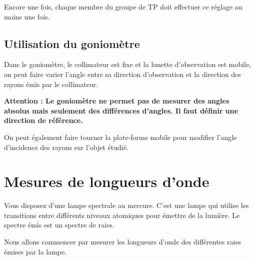 \documentclass{tp}
\begin{document}
Encore une fois, chaque membre du groupe de TP doit effectuer ce réglage au moins une fois.

\subsection{Utilisation du goniomètre}
Dans le goniomètre, le collimateur est fixe et la lunette d'observation est mobile, on peut faire varier l'angle entre sa direction d'observation et la direction des rayons émis par le collimateur.

\textbf{Attention : Le goniomètre ne permet pas de mesurer des angles absolus mais seulement des différences d'angles. Il faut définir une direction de référence.}

On peut également faire tourner la plate-forme mobile pour modifier l'angle d'incidence des rayons sur l'objet étudié.

\section{Mesures de longueurs d'onde}
Vous disposez d'une lampe spectrale au mercure. C'est une lampe qui utilise les transitions entre différents niveaux atomiques pour émettre de la lumière. Le spectre émis est un spectre de raies. 

Nous allons commencer par mesurer les longueurs d'onde des différentes raies émises par la lampe.
\end{document}
